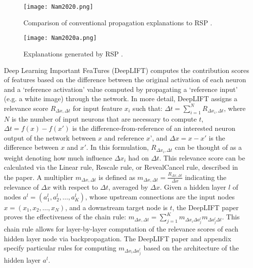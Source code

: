 \documentclass[journal]{IEEEtran}
\begin{document}
\begin{figure}
  \texttt{[image: Nam2020.png]}
  \caption{Comparison of conventional propagation explanations to RSP \cite{Nam2020}.}
\end{figure}

\begin{figure}
  \texttt{[image: Nam2020a.png]}
  \caption{Explanations generated by RSP \cite{Nam2020a}.}
\end{figure}

Deep Learning Important FeaTures (DeepLIFT) \cite{Shrikumar2017a} computes the contribution scores of features based on the difference between the original activation of each neuron and a ‘reference activation’ value computed by propagating a ‘reference input’ (e.g. a white image) through the network. In more detail, DeepLIFT assigns a relevance score $R_{\Delta x,\Delta t}$ for input feature $x_i$ such that: $\Delta t=\sum_{i=1}^NR_{\Delta x_i,\Delta t}$, where $N$ is the number of input neurons that are necessary to compute $t$, $\Delta t=f(x)-f(x')$ is the difference-from-reference of an interested neuron output of the network between $x$ and reference $x’$, and $\Delta x=x-x'$ is the difference between $x$ and $x'$. In this formulation, $R_{\Delta x_i,\Delta t}$ can be thought of as a weight denoting how much influence $\Delta x_i$ had on $\Delta t$. This relevance score can be calculated via the Linear rule, Rescale rule, or RevealCancel rule, described in the paper. A multiplier  $m_{\Delta x,\Delta t}$ is defined as $m_{\Delta x,\Delta t}=\frac{R_{\Delta x,\Delta t}}{\Delta x}$ indicating the relevance of $\Delta x$ with respect to $\Delta t$, averaged by $\Delta x$. Given a hidden layer $l$ of nodes $a^l=(a_1^l,a_2^l,…,a_K^l)$, whose upstream connections are the input nodes $x=(x_1,x_2,…,x_N)$, and a downstream target node is $t$, the DeepLIFT paper proves the effectiveness of the chain rule: $m_{\Delta x,\Delta t}=\sum_{j=1}^Km_{\Delta x_i \Delta a_j^l}m_{\Delta a_j^l \Delta t}$. This chain rule allows for layer-by-layer computation of the relevance scores of each hidden layer node via backpropagation. The DeepLIFT paper and appendix specify particular rules for computing $m_{\Delta x_i \Delta a_j^l}$ based on the architecture of the hidden layer $a^l$. 
\end{document}
